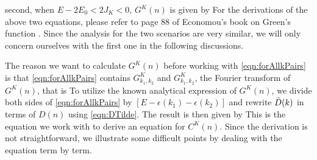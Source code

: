 second, when $E - 2 E_0 < 2 J_K < 0$, $G^{K}(n)$ is given by
For the derivations of the above two equations, please refer to page 88 of Economou's book on Green's function
 \cite{economou2006}. Since the analysis for the two  scenarios are very similar, we will only concern ourselves with the first one
in the following discussions. 

The reason we want to calculate $G^{K}(n)$ before working with \autoref{eqn:forAllkPairs} is that
 \autoref{eqn:forAllkPairs}  contains $G^{K}_{k_1, k_2}$ and $G^{K}_{k_1, k_2}$, the Fourier transform of  $G^{K}(n)$, that is
To utilize the known analytical expression of $G^{K}(n)$, we divide both sides of \autoref{eqn:forAllkPairs} by
$\left[ E - \epsilon(k_1) -  \epsilon(k_2)\right]$ and rewrite $\Tilde{D}(k)$ in terms of $D(n)$ using \autoref{eqn:DTilde}.   The result is then given by
\clearpage
{}
This is the equation we work with to derive an equation for $C^{K}(n)$. Since the derivation is not straightforward, we
illustrate some difficult points by dealing with the equation term by term.  

